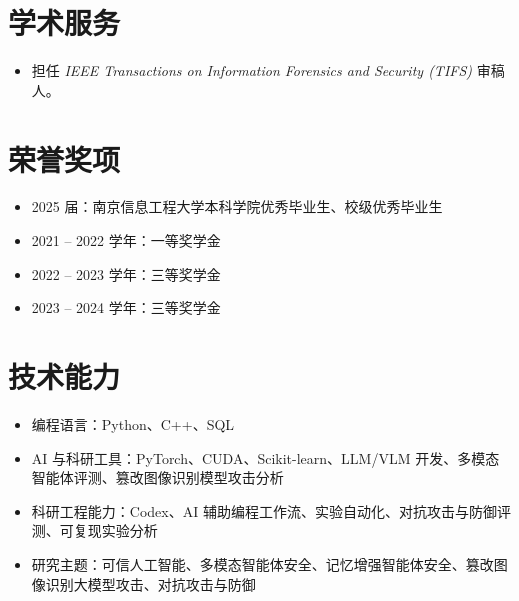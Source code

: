\documentclass[10pt,a4paper]{ctexart}
\begin{document}
\section*{学术服务}
\begin{itemize}
  \item 担任 \textit{IEEE Transactions on Information Forensics and Security (TIFS)} 审稿人。
\end{itemize}

\section*{荣誉奖项}
\begin{itemize}
  \item 2025 届：南京信息工程大学本科学院优秀毕业生、校级优秀毕业生
  \item 2021 -- 2022 学年：一等奖学金
  \item 2022 -- 2023 学年：三等奖学金
  \item 2023 -- 2024 学年：三等奖学金
\end{itemize}

\section*{技术能力}
\begin{itemize}
  \item 编程语言：Python、C++、SQL
  \item AI 与科研工具：PyTorch、CUDA、Scikit-learn、LLM/VLM 开发、多模态智能体评测、篡改图像识别模型攻击分析
  \item 科研工程能力：Codex、AI 辅助编程工作流、实验自动化、对抗攻击与防御评测、可复现实验分析
  \item 研究主题：可信人工智能、多模态智能体安全、记忆增强智能体安全、篡改图像识别大模型攻击、对抗攻击与防御
\end{itemize}
\end{document}
